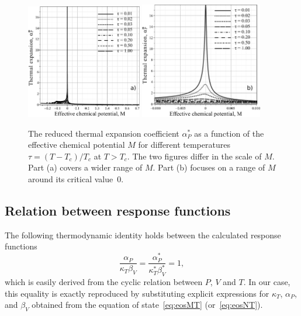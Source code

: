 \begin{figure}[h!]
	\centering \includegraphics[width=0.45\textwidth]{f4b.pdf}
	\includegraphics[width=0.475\textwidth]{f4c.pdf}
	\vskip-3mm\caption{The reduced thermal expansion coefficient $\alpha^*_P$ as a function of the effective chemical potential $M$ for different temperatures $\tau = (T - T_c)/T_c$ at $T > T_c$. The two figures differ in the scale of $M$. Part (a) covers a wider range of $M$. Part (b) focuses on a range of $M$ around its critical value~$0$.
	}\label{fig4b}
\end{figure}

\subsection{Relation between response functions}
The following thermodynamic identity holds between the calculated response functions
\begin{equation}
	\label{eq:identity}
	\frac{\alpha_P}{\kappa_T \beta_V} = \frac{\alpha^*_P}{\kappa^*_T \beta^*_V} = 1,
\end{equation}
which is easily derived from the cyclic relation between $P$, $V$ and $T$. In our case, this equality is exactly reproduced by substituting explicit expressions for $\kappa_T$, $\alpha_P$, and $\beta_V$ obtained from the equation of state~\eqref{eq:eosMT} (or~\eqref{eq:eosNT}). 

